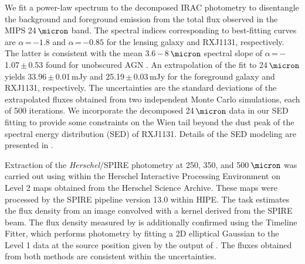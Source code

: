 \documentclass[]{emulateapj}
\begin{document}
We fit a power-law spectrum to the
decomposed IRAC photometry to disentangle the background and foreground 
emission from the total flux observed in the MIPS 24\,$\micron$ band. 
The spectral indices corresponding to best-fitting curves are $\alpha$\,=\,$-1.8$ and
$\alpha$\,=\,$-0.85$ for the lensing galaxy and RXJ1131, respectively.
The latter
 is consistent with the mean 3.6\,$-$\,8\,$\micron$
spectral slope of
$\alpha$\,=\,$-$1.07\,$\pm$\,0.53 found for unobscured AGN
\citep{Stern05a}. An extrapolation of the fit to 24\,$\micron$
yields 33.96\,$\pm$\,0.01\,mJy and 25.19\,$\pm$\,0.03\,mJy
for the foreground galaxy and RXJ1131, respectively.
The uncertainties are the standard deviations of 
the extrapolated fluxes obtained from two independent Monte Carlo 
simulations, each of 500 iterations.
We incorporate the decomposed 24\,$\micron$ data in our
SED fitting to provide some constraints on
the Wien tail beyond the dust peak
of the spectral energy distribution (SED) of RXJ1131.
Details of the SED modeling are presented in .

Extraction of the {\it Herschel}/SPIRE photometry at 250, 350, and 500\,$\micron$ was
carried out using  within the Herschel Interactive
Processing Environment \citep[HIPE;][]{Ott10a}
on Level 2 maps obtained from the Herschel Science Archive.
These maps were processed by the SPIRE pipeline
version 13.0 within HIPE. The  task estimates
the flux density from an image convolved with a kernel
derived from the SPIRE beam. The flux density
measured by  is additionally confirmed
using the Timeline Fitter, which performs photometry
by fitting a 2D elliptical Gaussian to the Level 1 data at the
source position given by the output of . The fluxes
obtained from both methods are consistent within the uncertainties.



\end{document}
